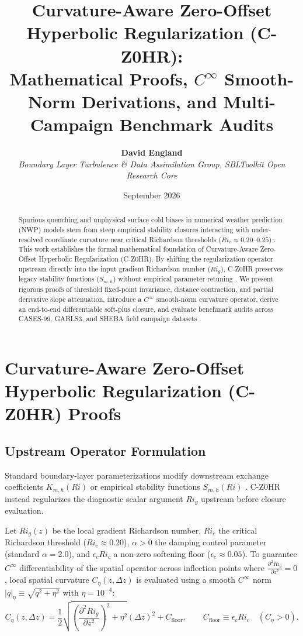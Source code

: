 \documentclass[11pt,a4paper]{article}
\title{\textbf{Curvature-Aware Zero-Offset Hyperbolic Regularization (C-Z0HR):\\Mathematical Proofs, $C^\infty$ Smooth-Norm Derivations, and Multi-Campaign Benchmark Audits}}
\author{\textbf{David England}\\
\small\textit{Boundary Layer Turbulence \& Data Assimilation Group, SBLToolkit Open Research Core}}
\date{September 2026}
\begin{document}
\maketitle

\begin{abstract}
Spurious quenching and unphysical surface cold biases in numerical weather prediction (NWP) models stem from steep empirical stability closures interacting with under-resolved coordinate curvature near critical Richardson thresholds ($Ri_c \approx 0.20$--$0.25$) \citep{nieuwstadt1984turbulent, louis1979parametric}. This work establishes the formal mathematical foundation of Curvature-Aware Zero-Offset Hyperbolic Regularization (C-Z0HR). By shifting the regularization operator upstream directly into the input gradient Richardson number ($Ri_g$), C-Z0HR preserves legacy stability functions ($S_{m,h}$) without empirical parameter retuning \citep{england1995stability}. We present rigorous proofs of threshold fixed-point invariance, distance contraction, and partial derivative slope attenuation, introduce a $C^\infty$ smooth-norm curvature operator, derive an end-to-end differentiable soft-plus closure, and evaluate benchmark audits across CASES-99, GABLS3, and SHEBA field campaign datasets \citep{poulos2002cases, bosveld2014third, uttal2002surface}.
\end{abstract}

\section{Curvature-Aware Zero-Offset Hyperbolic Regularization (C-Z0HR) Proofs}

\subsection{Upstream Operator Formulation}
Standard boundary-layer parameterizations modify downstream exchange coefficients $K_{m,h}(Ri)$ or empirical stability functions $S_{m,h}(Ri)$ \citep{businger1971flux, louis1979parametric}. C-Z0HR instead regularizes the diagnostic scalar argument $Ri_g$ upstream before closure evaluation.

Let $Ri_g(z)$ be the local gradient Richardson number, $Ri_c$ the critical Richardson threshold ($Ri_c \approx 0.20$), $\alpha > 0$ the damping control parameter (standard $\alpha = 2.0$), and $\epsilon_c Ri_c$ a non-zero softening floor ($\epsilon_c \approx 0.05$). To guarantee $C^\infty$ differentiability of the spatial operator across inflection points where $\frac{\partial^2 Ri_g}{\partial z^2} = 0$, local spatial curvature $C_\eta(z, \Delta z)$ is evaluated using a smooth $C^\infty$ norm $|q|_\eta \equiv \sqrt{q^2 + \eta^2}$ with $\eta = 10^{-4}$:
\begin{equation}
C_\eta(z, \Delta z) = \frac{1}{2} \sqrt{\left( \frac{\partial^2 Ri_g}{\partial z^2} \right)^2 + \eta^2} (\Delta z)^2 + C_{\text{floor}}, \qquad C_{\text{floor}} \equiv \epsilon_c Ri_c \quad (C_\eta > 0).
\label{eq:curvature_scale}
\end{equation}
\end{document}
